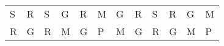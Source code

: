 \documentclass{article}
\begin{document}

\begin{tabularx}{\textwidth}{|| Y Y Y Y | Y Y Y Y | Y Y Y Y ||}
	S & R & S & G & R & M & G & R & S & R & G & M \\
	R & G & R & M & G & P & M & G & R & G & M & P
\end{tabularx}
\end{document}
